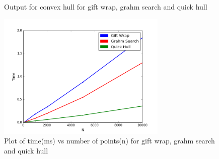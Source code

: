 \documentclass[a4paper,12pt]{article}
\begin{document}
\begin{center}
\begin{figure}[ht!]
    \caption{Output for convex hull for gift wrap, grahm search and quick hull}
    \end{figure}
    \begin{figure}[!h]
        \centering
        \includegraphics[width=0.72\textwidth]{6}
        \caption{Plot of time(ms) vs number of points(n) for gift wrap, grahm search and quick hull }
        \label{fig:6}
    \end{figure}
\end{center}
\end{document}

